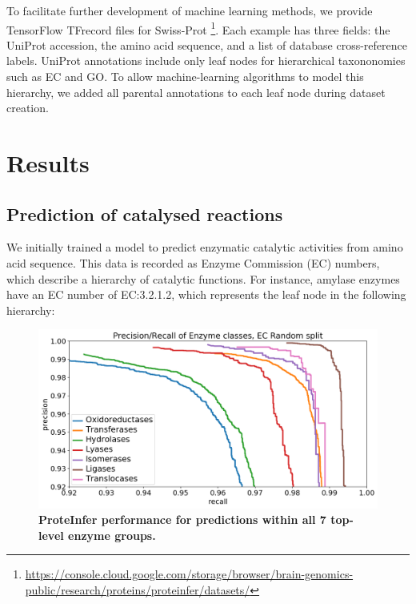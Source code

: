 To facilitate further development of machine learning methods, we provide TensorFlow \citep{abadi2016tensorflow} TFrecord files for Swiss-Prot \footnote{\url{https://console.cloud.google.com/storage/browser/brain-genomics-public/research/proteins/proteinfer/datasets/}}. Each example has three fields: the UniProt accession, the amino acid sequence, and a list of database cross-reference labels. UniProt annotations include only leaf nodes for hierarchical taxononomies such as EC and GO. To allow machine-learning algorithms to model this hierarchy, we added all parental annotations to each leaf node during dataset creation. 
\section*{Results}
\subsection*{Prediction of catalysed reactions}
We initially trained a model to predict enzymatic catalytic activities from amino acid sequence. This data is recorded as Enzyme Commission (EC) numbers, which describe a hierarchy of catalytic functions. For instance, \textbeta{} amylase enzymes have an EC number of EC:3.2.1.2, which represents the leaf node in the following hierarchy:
\renewcommand\DTstyle{\rmfamily}
\setlength{\DTbaselineskip}{15pt}
\medskip
{}
\medskip
\begin{figure}
\centering
  \includegraphics[width=\columnwidth]{Figures/ec_performance_by_top_level_class.png}%
  \caption{\textbf{ProteInfer performance for predictions within all 7 top-level enzyme groups.}}
  \label{fig:toplevel}
\end{figure}

